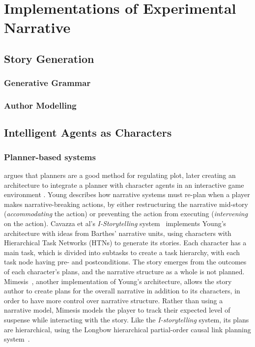 \section{Implementations of Experimental Narrative}
\label{sec:implementations}

\subsection{Story Generation}

\subsubsection{Generative Grammar}

\subsubsection{Author Modelling}


\subsection{Intelligent Agents as Characters}

\subsubsection{Planner-based systems}
\citep{young1999notes} argues that planners are a good method for regulating plot, later creating an architecture to integrate a planner with character agents in an interactive game environment \cite{young2004architecture}. Young describes how narrative systems must re-plan when a player makes  narrative-breaking actions, by either restructuring the narrative mid-story (\emph{accommodating} the action) or preventing the action from executing (\emph{intervening} on the action).
Cavazza et al's \emph{I-Storytelling} system~\cite{cavazza2002character} implements Young's architecture with ideas from Barthes' narrative units, using characters with Hierarchical Task Networks (HTNs) to generate its stories. Each character has a main task, which is divided into subtasks to create a task hierarchy, with each task node having pre- and postconditions. The story emerges from the outcomes of each character's plans, and the narrative structure as a whole is not planned.
Mimesis~\cite{riedl2003managing}, another implementation of Young's architecture, allows the story author to create plans for the overall narrative in addition to its characters, in order to have more control over narrative structure. Rather than using a narrative model, Mimesis models the player to track their expected level of suspense while interacting with the story. Like the \emph{I-storytelling} system, its plans are hierarchical, using the Longbow hierarchical partial-order causal link planning system~\cite{young1994decomposition}.

